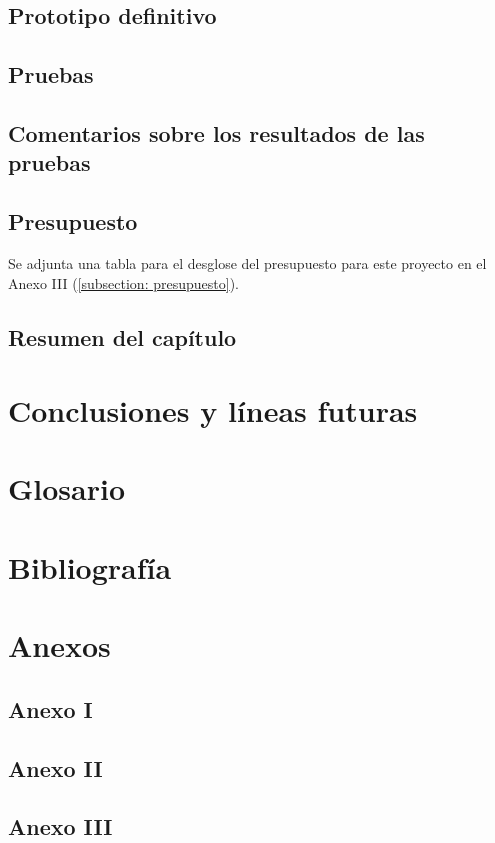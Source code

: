 \documentclass[12pt]{article}
\begin{document}
	\subsection[Prototipo definitivo]{Prototipo definitivo}
	\subsection[Pruebas]{Pruebas}
	\subsection[Comentarios sobre los resultados de las pruebas]{Comentarios sobre los resultados de las pruebas}
	\subsection[Presupuesto]{Presupuesto}
	\noindent Se adjunta una tabla para el desglose del presupuesto para este proyecto en el Anexo III (\ref{subsection: presupuesto}).
	\subsection[Resumen del capítulo]{Resumen del capítulo}
	
	\section[Conclusiones y líneas futuras]{Conclusiones y líneas futuras}
	
	\section*{Glosario}
	
	\section*{Bibliografía}
	
	\section*{Anexos}
	
	\subsection*{Anexo I}
	
	\subsection*{Anexo II}
	
	\subsection*{Anexo III}
	\label{subsection: presupuesto}
	
	
\end{document}
